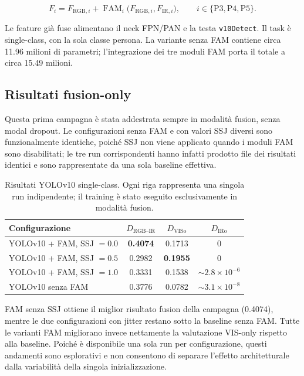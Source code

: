 \documentclass[a4paper,11pt]{article}
\begin{document}
\[
F_i=F_{\mathrm{RGB},i}+\operatorname{FAM}_i
\bigl(F_{\mathrm{RGB},i},F_{\mathrm{IR},i}\bigr),
\qquad i\in\{\mathrm{P3},\mathrm{P4},\mathrm{P5}\}.
\]

Le feature già fuse alimentano il neck FPN/PAN e la testa \texttt{v10Detect}. Il task è single-class, con la sola classe persona. La variante senza FAM contiene circa 11.96 milioni di parametri; l'integrazione dei tre moduli FAM porta il totale a circa 15.49 milioni.

\subsection{Risultati fusion-only}

Questa prima campagna è stata addestrata sempre in modalità fusion, senza modal dropout. Le configurazioni senza FAM e con valori SSJ diversi sono funzionalmente identiche, poiché SSJ non viene applicato quando i moduli FAM sono disabilitati; le tre run corrispondenti hanno infatti prodotto file dei risultati identici e sono rappresentate da una sola baseline effettiva.

\begin{table}[htbp]
\centering
\caption{Risultati YOLOv10 single-class. Ogni riga rappresenta una singola run indipendente; il training è stato eseguito esclusivamente in modalità fusion.}
\label{tab:yolo_results}
\begin{tabular}{lccc}
\toprule
Configurazione & $D_{\text{RGB--IR}}$ & $D_{\text{VISo}}$ & $D_{\text{IRo}}$ \\
\midrule
YOLOv10 + FAM, SSJ $=0.0$ & \textbf{0.4074} & 0.1713 & 0 \\
YOLOv10 + FAM, SSJ $=0.5$ & 0.2982 & \textbf{0.1955} & 0 \\
YOLOv10 + FAM, SSJ $=1.0$ & 0.3331 & 0.1538 & $\sim2.8\times10^{-6}$ \\
YOLOv10 senza FAM & 0.3776 & 0.0782 & $\sim3.1\times10^{-8}$ \\
\bottomrule
\end{tabular}
\end{table}

FAM senza SSJ ottiene il miglior risultato fusion della campagna (0.4074), mentre le due configurazioni con jitter restano sotto la baseline senza FAM. Tutte le varianti FAM migliorano invece nettamente la valutazione VIS-only rispetto alla baseline. Poiché è disponibile una sola run per configurazione, questi andamenti sono esplorativi e non consentono di separare l'effetto architetturale dalla variabilità della singola inizializzazione.
\end{document}
